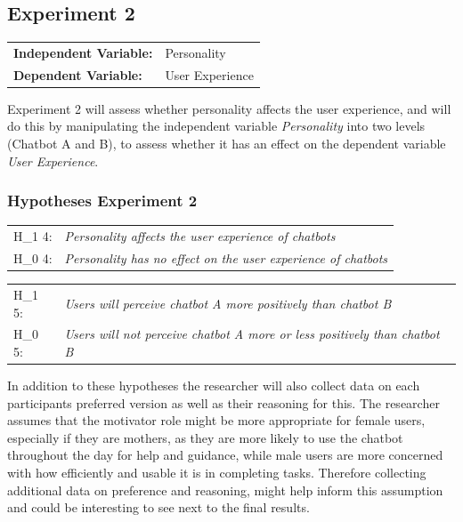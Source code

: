 \subsection{Experiment 2}

\vspace{2,5mm}

\begin{tabular}[h]{ l l }
    \textbf{Independent Variable:} & Personality \\ 
    \textbf{Dependent Variable:} & User Experience \\  
\end{tabular}
    
\vspace{2,5mm}

Experiment 2 will assess whether personality affects the user experience, and will do this by manipulating the independent variable \textit{Personality} into two levels (Chatbot A and B), to assess whether it has an effect on the dependent variable \textit{User Experience}.

    \subsubsection{Hypotheses Experiment 2}
    
    \begin{table}[h]
    \begin{tabular}{ll}
    H_1 4: & \textit{Personality affects the user experience of chatbots} \\
    H_0 4: & \textit{Personality has no effect on the user experience of chatbots} \\
    \end{tabular}
    \end{table}

    \begin{table}[h]
    \begin{tabular}{ll}
    H_1 5: & \textit{Users will perceive chatbot A more positively than chatbot B} \\
    H_0 5: & \textit{Users will not perceive chatbot A more or less positively than chatbot B} \\
    \end{tabular}
    \end{table} In addition to these hypotheses the researcher will also collect data on each participants preferred version as well as their reasoning for this. The researcher assumes that the motivator role might be more appropriate for female users, especially if they are mothers, as they are more likely to use the chatbot throughout the day for help and guidance, while male users are more concerned with how efficiently and usable it is in completing tasks. Therefore collecting additional data on preference and reasoning, might help inform this assumption and could be interesting to see next to the final results.
    
